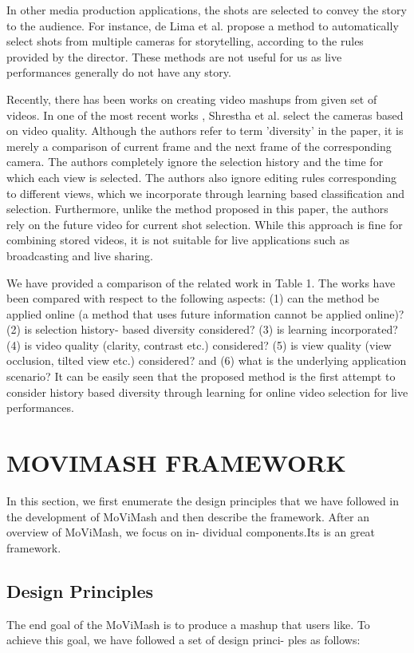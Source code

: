 \documentclass{sig-alternate-05-2015}
\begin{document}
In other media production applications, the shots are selected to
convey the story to the audience. For instance, de Lima et al. \cite{7}
propose a method to automatically select shots from multiple cameras for storytelling, according to the rules provided by the director.
These methods are not useful for us as live performances generally
do not have any story.

Recently, there has been works on creating video mashups from
given set of videos. In one of the most recent works \cite{15}, Shrestha
et al. select the cameras based on video quality. Although the authors refer to term 'diversity' in the paper, it is merely a comparison of current frame and the next frame of the corresponding camera. The authors completely ignore the selection history and the time for which each view is selected. The authors also ignore editing rules corresponding to different views, which we incorporate
through learning based classification and selection. Furthermore,
unlike the method proposed in this paper, the authors rely on the
future video for current shot selection. While this approach is fine
for combining stored videos, it is not suitable for live applications
such as broadcasting and live sharing.

We have provided a comparison of the related work in Table 1.
The works have been compared with respect to the following aspects: (1) can the method be applied online (a method that uses future information cannot be applied online)? (2) is selection history-
based diversity considered? (3) is learning incorporated? (4) is
video quality (clarity, contrast etc.) considered? (5) is view quality
(view occlusion, tilted view etc.) considered? and (6) what is the
underlying application scenario? It can be easily seen that the proposed method is the first attempt to consider history based diversity
through learning for online video selection for live performances.

\section{MOVIMASH FRAMEWORK}
In this section, we first enumerate the design principles that we
have followed in the development of MoViMash and then describe
the framework. After an overview of MoViMash, we focus on in-
dividual components.Its is an great framework.

\subsection{Design Principles}
The end goal of the MoViMash is to produce a mashup that users
like. To achieve this goal, we have followed a set of design princi-
ples as follows:
\end{document}
